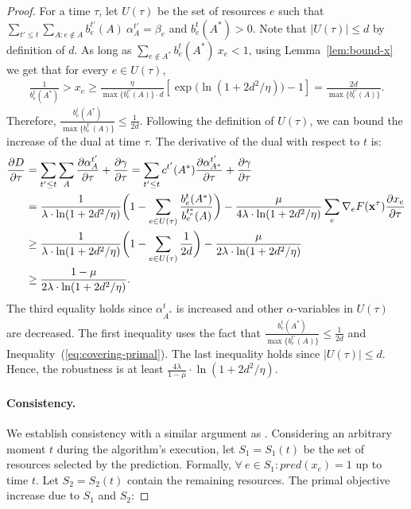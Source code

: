 \begin{proof}
For a time $\tau$, let $U(\tau)$ be the set of resources $e$ such that
$\sum_{t' \le t} \sum_{A: e \notin A} b^{t'}_{e}(A)\ \alpha^{t'}_{A} = \beta_{e}$ and $b^{t}_{e}(A^*) > 0$.
Note that $|U(\tau)| \leq d$ by definition of $d$.
As long as $\sum_{e \notin A^{*}} b^{t}_{e}(A^*)\ x_{e}  < 1$,
using Lemma~\ref{lem:bound-x} we get that for every $e \in U(\tau)$,
%
\begin{align*}
\frac{1}{b^{t}_{e}(A^*)} > x_{e} \geq \frac{\eta}{\max \{b^{t'}_{e}(A)\} \cdot d}
				\left[ \exp\biggl(\ln(1+2d^{2}/\eta) \biggr) - 1 \right]
				= \frac{2 d}{\max \{b^{t'}_{e}(A)\}}.
\end{align*}
Therefore, $\frac{b^{t}_{e}(A^{*})}{\max \{b^{t'}_{e}(A)\}} \leq \frac{1}{2d}$. Following the definition of $U(\tau)$, we can bound the increase of the dual at time $\tau$.
The derivative of the dual with respect to $t$ is:
\begin{align*}
\frac{\partial D}{\partial \tau}
&=  \sum_{t' \le t} \sum_{A} \frac{\partial \alpha^{t'}_{A}}{\partial \tau} + \frac{\partial \gamma}{\partial \tau}
	= \sum_{t' \le t} c^{t'}(A^{*})  \frac{\partial \alpha^{t'}_{A^{*}}}{\partial \tau} + \frac{\partial \gamma}{\partial \tau} \\
&= \frac{1}{\lambda \cdot \ln(1 + 2d^{2}/\eta)} \biggl(1 - \sum_{e \in U(\tau)} \frac{b^{t}_{e}(A^{*})}{b^{t_{e}^{*}}_{e}(A)} \biggr)
	- \frac{\mu}{4\lambda \cdot \ln(1 + 2d^{2}/\eta)} \sum_{e} \nabla_{e} F(\vect{x}^{\tau}) \frac{\partial x_{e}}{\partial \tau} \\
%
&\geq \frac{1}{\lambda \cdot \ln(1 + 2d^{2}/\eta)} \biggl(1 - \sum_{e \in U(\tau)} \frac{1}{2d} \biggr)
	- \frac{\mu}{2 \lambda \cdot \ln(1 + 2d^{2}/\eta)} \\
%
&\geq \frac{1 - \mu}{2 \lambda \cdot \ln(1 + 2d^{2}/\eta)}.
\end{align*}
The third equality holds since $\alpha^{t}_{A^{*}}$ is increased and other $\alpha$-variables in
$U(\tau)$ are decreased. The first inequality uses the fact that $\frac{b^{t}_{e}(A^{*})}{\max \{b^{t'}_{e}(A)\}} \leq \frac{1}{2d}$
and Inequality~(\ref{eq:covering-primal}).
The last inequality holds since $|U(\tau)| \leq d$.
Hence, the robustness is at least $\frac{4 \lambda}{1 - \mu} \cdot \ln(1 + 2d^{2}/\eta)$.

\paragraph{Consistency.} We establish consistency with a similar argument as \cite{BamasMaggiori20:The-Primal-Dual-method}.
Considering an arbitrary moment $t$ during the algorithm's execution, let $S_{1} = S_{1}(t)$ be the set of resources selected by the prediction. Formally, $\forall\ e \in S_{1} : pred(x_{e}) = 1$ up to time $t$. Let $S_{2} = S_{2}(t)$ contain the remaining resources.
The primal objective increase due to $S_{1}$ and $S_{2}$:


\end{proof}
